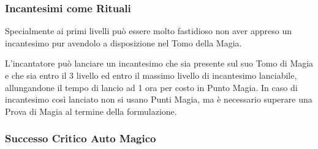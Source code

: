 \begin{multicols}{2}



\subsubsection*{Incantesimi come Rituali}

Specialmente ai primi livelli può essere molto fastidioso non aver appreso un incantesimo pur avendolo a disposizione nel Tomo della Magia.

L'incantatore può lanciare un incantesimo che sia presente sul suo Tomo di Magia e che sia entro il 3 livello ed entro il massimo livello di incantesimo lanciabile, allungandone il tempo di lancio ad 1 ora per costo in Punto Magia. In caso di incantesimo così lanciato non si usano Punti Magia, ma è necessario superare una Prova di Magia al termine della formulazione.

\subsubsection{Successo Critico Auto Magico}\label{magienova}


\end{multicols}
